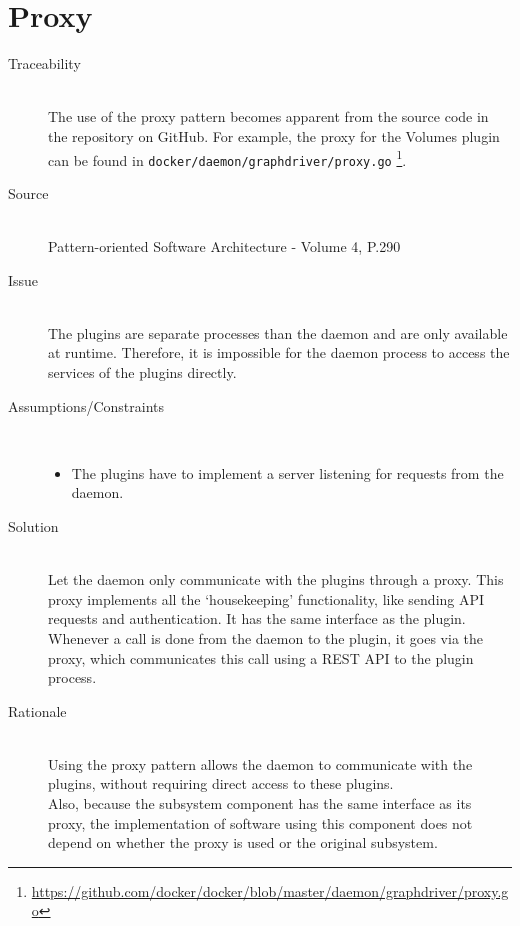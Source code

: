 \section{Proxy}
\begin{description}

\item [Traceability]~\\
The use of the {proxy} pattern becomes apparent from the source code in the repository on GitHub.
For example, the proxy for the Volumes plugin can be found in \verb|docker/daemon/graphdriver/proxy.go| \footnote{\url{https://github.com/docker/docker/blob/master/daemon/graphdriver/proxy.go}}.

\item [Source]~\\
Pattern-oriented Software Architecture - Volume 4, P.290 \cite{wiley4}

\item [Issue]~\\
The plugins are separate processes than the daemon and are only available at runtime. Therefore, it is impossible for the daemon process to access the services of the plugins directly.

\item [Assumptions/Constraints]~
\begin{itemize}
\item The plugins have to implement a server listening for requests from the daemon.
\end{itemize}

\item [Solution]~\\
Let the daemon only communicate with the plugins through a proxy. This proxy implements all the `housekeeping' functionality, like sending API requests and authentication. It has the same interface as the plugin. \\
Whenever a call is done from the daemon to the plugin, it goes via the proxy, which communicates this call using a REST API to the plugin process.

\item [Rationale] ~\\ 
Using the {proxy} pattern allows the daemon to communicate with the plugins, without requiring direct access to these plugins. \\
Also, because the subsystem component has the same interface as its proxy, the implementation of software using this component does not depend on whether the proxy is used or the original subsystem. 


\end{description}
